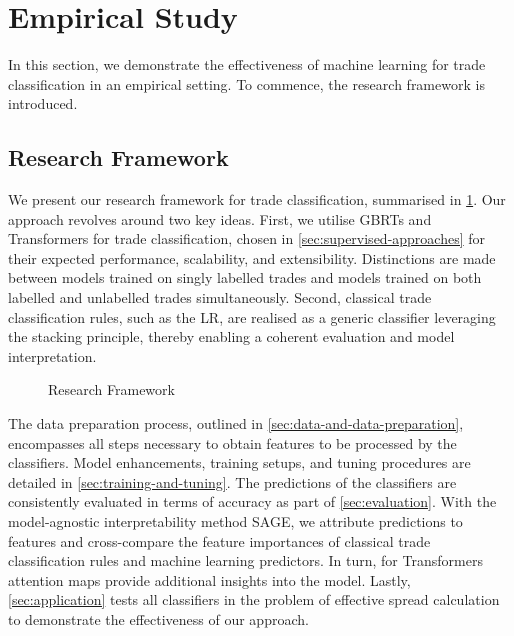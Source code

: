 \newpage
{}
\section{Empirical Study}\label{sec:empirical-study}

In this section, we demonstrate the effectiveness of machine learning for trade classification in an empirical setting. To commence, the research framework is introduced.

\subsection{Research Framework}\label{sec:research-framework}

We present our research framework for trade classification, summarised in \cref{fig:research-framework}. Our approach revolves around two key ideas. First, we utilise \glspl{GBRT} and Transformers for trade classification, chosen in \cref{sec:supervised-approaches} for their expected performance, scalability, and extensibility. Distinctions are made between models trained on singly labelled trades and models trained on both labelled and unlabelled trades simultaneously. Second, classical trade classification rules, such as the \gls{LR}, are realised as a generic classifier leveraging the stacking principle, thereby enabling a coherent evaluation and model interpretation.

\begin{figure}[!ht]
    \centering
    {\renewcommand\normalsize{\tiny}
    \normalsize
    }
    \caption[Research Framework]{Research Framework}
    \label{fig:research-framework}
\end{figure}

The data preparation process, outlined in \cref{sec:data-and-data-preparation}, encompasses all steps necessary to obtain features to be processed by the classifiers. Model enhancements, training setups, and tuning procedures are detailed in \cref{sec:training-and-tuning}. The predictions of the classifiers are consistently evaluated in terms of accuracy as part of \cref{sec:evaluation}. With the model-agnostic interpretability method \gls{SAGE}, we attribute predictions to features and cross-compare the feature importances of classical trade classification rules and machine learning predictors. In turn, for Transformers attention maps provide additional insights into the model. Lastly, \cref{sec:application} tests all classifiers in the problem of effective spread calculation to demonstrate the effectiveness of our approach.

